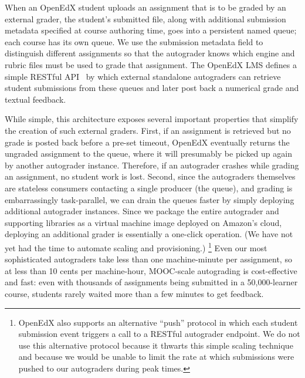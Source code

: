 When an OpenEdX student uploads an assignment that is to be graded by an
external grader, the student's submitted file, along with additional
submission metadata specified at course authoring time, goes into a
persistent named queue; each course has its own queue.
We use the submission metadata field to distinguish different
assignments so that the autograder knows which engine and rubric files
must be used to grade that assignment.
The OpenEdX LMS defines a simple RESTful
API~
by which external standalone autograders can retrieve student
submissions from these queues and later post back a numerical grade and
textual feedback.

While simple, this architecture exposes several important properties
that simplify the creation of such external graders.
First, if an assignment is retrieved but no grade is posted back before
a pre-set timeout, OpenEdX eventually returns the ungraded assignment to
the queue, where it will presumably be picked up again by another
autograder instance.
Therefore, if an autograder crashes while grading an assignment, no
student work is lost.
Second, since the autograders themselves are stateless consumers
contacting a single producer (the queue), and grading is
embarrassingly task-parallel, we can drain the queues faster by simply
deploying additional autograder instances.
Since we package the entire autograder and supporting libraries as a
virtual machine image deployed on Amazon's cloud, deploying an
additional grader is essentially a one-click operation. (We have not
yet had the time to automate scaling and provisioning.)
\footnote{OpenEdX also supports an alternative ``push'' protocol in which each student
submission event triggers a call to a RESTful autograder endpoint.
We do not use this
alternative protocol because it thwarts this simple scaling technique
and because we would be  unable to limit the rate at which
submissions were pushed to our autograders during peak times.}
Even our most sophisticated autograders take less than one
machine-minute per assignment, so at less than 10 cents per machine-hour,
MOOC-scale 
autograding is cost-effective and fast: even with
thousands of assignments being submitted in a 50,000-learner course,
students rarely waited more than a few minutes to get feedback.

